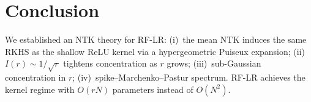 \section{Conclusion}

We established an NTK theory for RF-LR: (i)~the mean NTK induces the same RKHS as the shallow ReLU kernel via a hypergeometric Puiseux expansion; (ii)~\( I(r) \sim 1/\sqrt{r} \) tightens concentration as \( r \) grows; (iii)~sub-Gaussian concentration in \( r \); (iv)~spike--Marchenko--Pastur spectrum. RF-LR achieves the kernel regime with \( O(rN) \) parameters instead of \( O(N^2) \).
